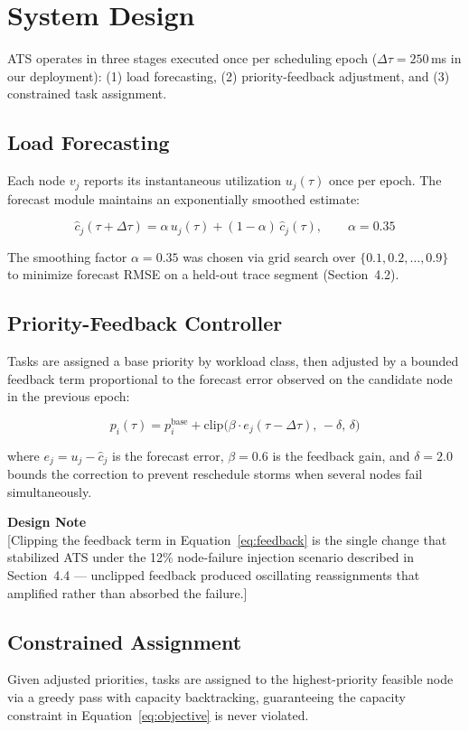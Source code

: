\section{System Design}

ATS operates in three stages executed once per scheduling epoch
($\Delta\tau = 250$\,ms in our deployment): (1) load forecasting,
(2) priority-feedback adjustment, and (3) constrained task assignment.

\subsection{Load Forecasting}

Each node $v_j$ reports its instantaneous utilization $u_j(\tau)$ once per
epoch. The forecast module maintains an exponentially smoothed estimate:

\begin{equation}
\hat{c}_j(\tau + \Delta\tau) = \alpha \, u_j(\tau) + (1-\alpha)\, \hat{c}_j(\tau), \qquad \alpha = 0.35
\label{eq:forecast}
\end{equation}

The smoothing factor $\alpha = 0.35$ was chosen via grid search over
$\{0.1, 0.2, \dots, 0.9\}$ to minimize forecast RMSE on a held-out trace
segment (Section~4.2).

\subsection{Priority-Feedback Controller}

Tasks are assigned a base priority by workload class, then adjusted by a
bounded feedback term proportional to the forecast error observed on the
candidate node in the previous epoch:

\begin{equation}
p_i(\tau) = p_i^{\text{base}} + \text{clip}\big(\beta \cdot e_j(\tau - \Delta\tau),\, -\delta,\, \delta\big)
\label{eq:feedback}
\end{equation}

where $e_j = u_j - \hat{c}_j$ is the forecast error, $\beta = 0.6$ is the
feedback gain, and $\delta = 2.0$ bounds the correction to prevent
reschedule storms when several nodes fail simultaneously.

\begin{keyboxblue}
\textbf{\color{yonseiblue}Design Note}\\{}
[Clipping the feedback term in Equation~\ref{eq:feedback} is the single
change that stabilized ATS under the 12\% node-failure injection scenario
described in Section~4.4 --- unclipped feedback produced oscillating
reassignments that amplified rather than absorbed the failure.]
\end{keyboxblue}

\subsection{Constrained Assignment}

Given adjusted priorities, tasks are assigned to the highest-priority
feasible node via a greedy pass with capacity backtracking, guaranteeing
the capacity constraint in Equation~\ref{eq:objective} is never violated.
